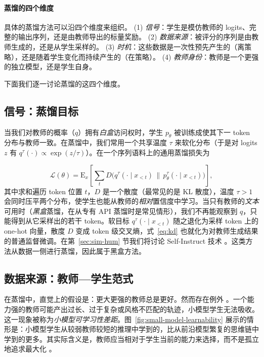 \paragraph{蒸馏的四个维度}
具体的蒸馏方法可以沿四个维度来组织。
(1) \emph{信号}：学生是模仿教师的 logits、完整的输出序列，还是由教师导出的标量奖励。
(2) \emph{数据来源}：被评分的序列是由教师生成的，还是从学生采样的。
(3) \emph{时机}：这些数据是一次性预先产生的（离策略），还是随着学生变化而持续产生的（在策略）。
(4) \emph{教师身份}：教师是一个更强的独立模型，还是学生自身。

下面我们逐一讨论蒸馏的这四个维度。

\subsection{信号：蒸馏目标}
当我们对教师的概率（$q$）拥有\emph{白盒}访问权时，学生 $p_\theta$ 被训练成使其下一 token 分布与教师一致。在蒸馏中，我们常用一个共享温度 $\tau$ 来软化分布（于是对 logits $z$ 有 $q^{\tau}(\cdot) \propto \exp(z/\tau)$）。在一个序列语料上的通用蒸馏损失为

\begin{equation}
    \mathcal{L}(\theta) = \mathrm{E}_{x}\left[ \sum_{t} D\big( q^{\tau}(\cdot \mid x_{<t}) \,\|\, p^{\tau}_\theta(\cdot \mid x_{<t}) \big) \right],
    \label{eq:kd}
\end{equation}
其中求和遍历 token 位置 $t$，$D$ 是一个散度（最常见的是 KL 散度），温度 $\tau > 1$ 会同时压平两个分布，使学生也能从教师的\emph{相对}置信度中学习。当只有教师的\emph{文本}可用时（\emph{黑盒}蒸馏，在从专有 API 蒸馏时是常见情形），我们不再能观察到 $q$，只能得到从它采样出的若干 token。软目标 $q^{\tau}(\cdot \mid x_{<t})$ 随之退化为采样 token 上的 one-hot 向量，散度 $D$ 变成 token 级交叉熵，式~\ref{eq:kd} 也就化为对教师生成结果的普通监督微调。在第~\ref{sec:sim-hum} 节我们将讨论 Self-Instruct 技术 \citep{wang-etal-2023-self-instruct}。这类方法从数据一侧进行蒸馏，因此属于黑盒方法。


\subsection{数据来源：教师—学生范式}
在蒸馏中，直觉上的假设是：更大更强的教师总是更好。然而存在例外 \citep{xu-etal-2025-stronger, li-etal-2025-small-models}。一个能力强的教师可能产出过长、过于复杂或风格不匹配的轨迹，小模型学生无法吸收。这一现象被称为\emph{小模型可学习性差距}。图~\ref{fig:small-model-learnability} 展示的情形是：小模型学生从较弱教师较短的推理中学到的，比从前沿模型繁复的思维链中学到的更多。其实际含义是，教师应当相对于学生当前的能力来选择，而不是孤立地追求最大化 \citep{zhang-etal-2026-find}。

